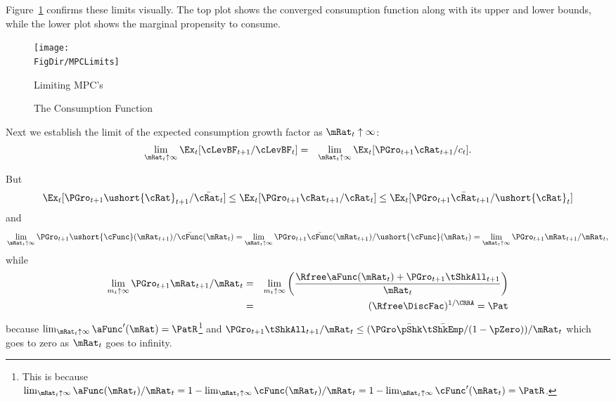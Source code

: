 \documentclass[titlepage]{\econtex}\providecommand{\texname}{BufferStockTheory}
\providecommand{\FigDir}{Figures}
\begin{document}
{Figure~\ref{fig:mpclimits} confirms these limits visually.  The top
plot shows the converged consumption function along with its upper and lower bounds,
while the lower plot shows the marginal propensity to consume.
\renewcommand{\figFile}{MPCLimits}
\hypertarget{\figFile}{}
\begin{figure}
\centerline{\texttt{[image: \\FigDir/MPCLimits]}}
\caption{Limiting MPC's}
\label{fig:mpclimits}
\end{figure}

\renewcommand{\figFile}{cFuncBounds}
\hypertarget{\figFile}{}
\begin{figure}
\centering
{}
\caption{The Consumption Function}
\label{fig:cFuncBounds}
\end{figure}

Next we establish the limit of the expected consumption growth factor
as $\mRat_{t} \uparrow \infty$:
\begin{eqnarray}
\lim_{\mRat_{t} \uparrow \infty} \Ex_{t}[
\cLevBF_{t+1}/\cLevBF_{t}] & = & \lim_{\mRat_{t} \uparrow \infty} \Ex_{t}[
{\PGro}_{t+1} {\cRat}_{t+1}/c_{t}]. \notag
\end{eqnarray}

But
\begin{eqnarray*}
\Ex_{t}[{\PGro}_{t+1} {\ushort{\cRat}}_{t+1}/\bar{\cRat_{t}}] \leq \Ex_{t}[{\PGro}_{t+1} {\cRat}_{t+1}/\cRat_{t}] \leq \Ex_{t}[{\PGro}_{t+1} {\bar{\cRat}}_{t+1}/\ushort{\cRat}_{t}]
\end{eqnarray*}
and
\begin{equation}  \label{eq:xttoinfty}
\lim_{\mRat_t \uparrow \infty} \PGro_{t+1}\ushort{\cFunc}(\mRat_{t+1})/\bar{\cFunc}(\mRat_t) =
\lim_{\mRat_{t} \uparrow \infty} \PGro_{t+1}\bar{\cFunc}(\mRat_{t+1})/\ushort{\cFunc}(\mRat_t) =
\lim_{\mRat_{t} \uparrow \infty}\PGro_{t+1} \mRat_{t+1}/\mRat_t,  \notag
\end{equation}
while
\begin{eqnarray*}  \label{eq:xtp1toinfty}
\lim_{m_{t} \uparrow \infty} \PGro_{t+1} \mRat_{t+1}/\mRat_t & = & \lim_{m_{t} \uparrow \infty}
\left(\frac{\Rfree \aFunc(\mRat_t)+{\PGro}_{t+1}\tShkAll_{t+1}}{\mRat_t}\right)
\\ & = & (\Rfree \DiscFac)^{1/\CRRA} = \Pat
\end{eqnarray*}
because $\lim_{\mRat_{t}\uparrow \infty} \aFunc^{\prime}(\mRat)=\PatR$\footnote{This is because $\lim_{\mRat_{t}\uparrow \infty} \aFunc(\mRat_{t})/\mRat_{t}=1-\lim_{\mRat_{t}\uparrow \infty} \cFunc(\mRat_{t})/\mRat_{t}=1-\lim_{\mRat_{t}\uparrow \infty}\cFunc^{\prime}(\mRat_{t})=\PatR$.} and
$\PGro_{t+1}\tShkAll_{t+1}/\mRat_{t} \leq (\PGro \bar{\pShk} \bar{\tShkEmp}/\pNotZero )/\mRat_{t}$ which
goes to zero as $\mRat_{t}$ goes to infinity.

}
\end{document}
